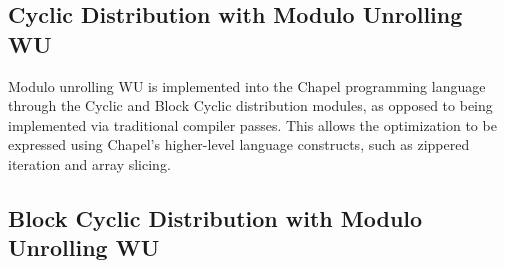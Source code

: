 \subsection{Cyclic Distribution with Modulo Unrolling WU}\label{subsec:cyclic_modulo}

Modulo unrolling WU is implemented into the Chapel programming language through the Cyclic and Block Cyclic distribution modules, as opposed to being implemented via traditional compiler passes. This allows the optimization to be expressed using Chapel's higher-level language constructs, such as zippered iteration and array slicing. 

\subsection{Block Cyclic Distribution with Modulo Unrolling WU}\label{subsec:block_cyclic_modulo}

